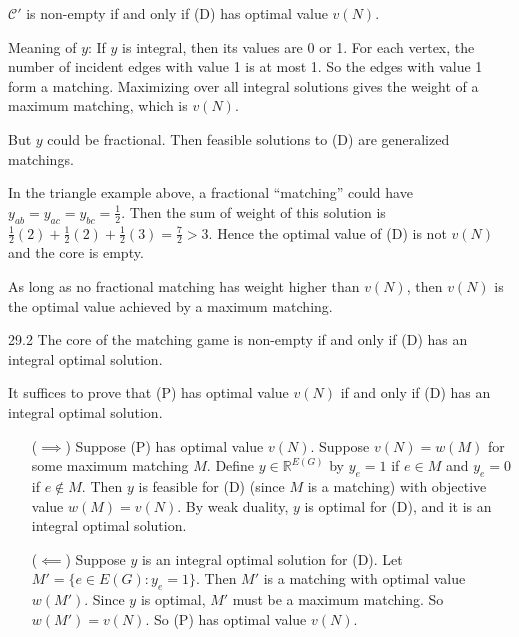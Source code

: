 \documentclass[12pt,letterpaper]{report}
\begin{document}
$\mathcal{C}'$ is non-empty if and only if (D) has optimal value $v(N)$.

Meaning of $y$:
If $y$ is integral, then its values are 0 or 1.
For each vertex, the number of incident edges with value 1 is at most 1.
So the edges with value 1 form a matching.
Maximizing over all integral solutions gives the weight of a maximum matching, which is $v(N)$.

But $y$ could be fractional.
Then feasible solutions to (D) are generalized matchings.

\begin{ex}
  In the triangle example above, a fractional ``matching'' could have
  $y_{ab} = y_{ac} = y_{bc} = \frac{1}{2}$.
  Then the sum of weight of this solution is
  $\frac{1}{2} (2) + \frac{1}{2} (2) + \frac{1}{2} (3) = \frac{7}{2} > 3$.
  Hence the optimal value of (D) is not $v(N)$ and the core is empty.
\end{ex}

As long as no fractional matching has weight higher than $v(N)$, then $v(N)$ is the optimal value
achieved by a maximum matching.

\begin{prop}{}{29.2}
  The core of the matching game is non-empty if and only if (D) has an integral optimal solution.
\end{prop}

\begin{thmproof}
  It suffices to prove that (P) has optimal value $v(N)$ if and only if (D) has an integral optimal
  solution.

  \begin{itemize}[leftmargin=4em]
    \item[($\implies$)]
    Suppose (P) has optimal value $v(N)$.
    Suppose $v(N) = w(M)$ for some maximum matching $M$.
    Define $y \in \mathbb{R}^{E(G)}$ by $y_e = 1$ if $e \in M$ and $y_e = 0$ if $e \not\in M$.
    Then $y$ is feasible for (D) (since $M$ is a matching) with objective value $w(M) = v(N)$.
    By weak duality, $y$ is optimal for (D), and it is an integral optimal solution.

    \item[($\impliedby$)]
    Suppose $y$ is an integral optimal solution for (D).
    Let $M' = \{ e \in E(G) : y_e = 1 \}$.
    Then $M'$ is a matching with optimal value $w(M')$.
    Since $y$ is optimal, $M'$ must be a maximum matching.
    So $w(M') = v(N)$.
    So (P) has optimal value $v(N)$.
  \end{itemize}
\end{thmproof}
\end{document}
